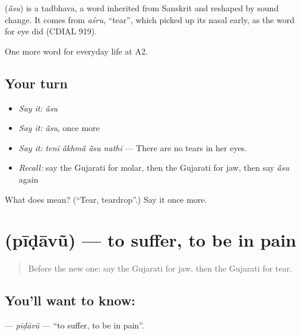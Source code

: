 \begin{cousinweb}
\textbf{} (\emph{ā̃su}) is a tadbhava, a word inherited from Sanskrit and reshaped by sound change. It comes from \emph{aśru}, \textquotedblleft{}tear\textquotedblright{}, which picked up its nasal early, as the word for eye did (CDIAL 919).
\end{cousinweb}

\begin{grammarlens}[title={What you've built}]
One more word for everyday life at A2.
\end{grammarlens}

\subsection*{Your turn}
\begin{itemize}
\raggedright
  \item \emph{Say it:} \emph{ā̃su}
  \item \emph{Say it:} \emph{ā̃su}, once more
  \item \emph{Say it:} \emph{tenī ā̃khmā̃ ā̃su nathī} — There are no tears in her eyes.
  \item \emph{Recall:} say the Gujarati for molar, then the Gujarati for jaw, then say \emph{ā̃su} again
\end{itemize}

\begin{tcolorbox}[breakable,colback=teal!4,colframe=teal!35!black,title={Before you move on}]
What does  mean? (\textquotedblleft{}Tear, teardrop\textquotedblright{}.) Say it once more.
\end{tcolorbox}
\section[\texorpdfstring{\gu{પીડાવું} (pīḍāvũ)}{પીડાવું (pīḍāvũ)}]{ (pīḍāvũ) — to suffer, to be in pain}

\label{lesson:GU-C230-pidavu}



\begin{quote}
Before the new one: say the Gujarati for jaw, then the Gujarati for tear.
\end{quote}

\subsection*{You'll want to know: }
\textbf{} — \emph{pīḍāvũ} — \textquotedblleft{}to suffer, to be in pain\textquotedblright{}.

